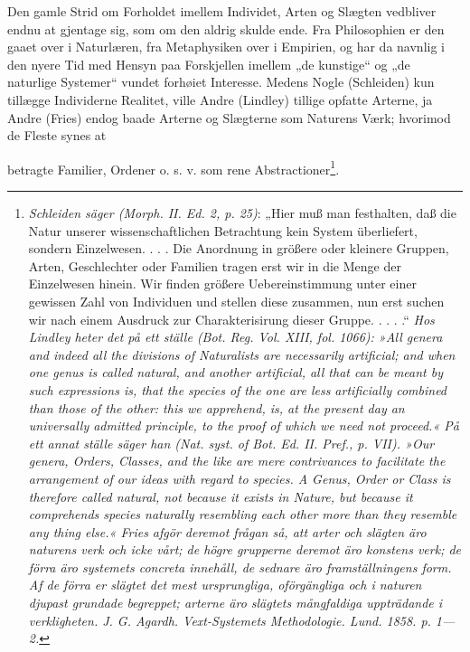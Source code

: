 \documentclass[12pt,a4paper]{book}
\begin{document}
Den gamle Strid om Forholdet imellem Individet, Arten og Slægten
vedbliver endnu at gjentage sig, som om den aldrig skulde ende. Fra
Philosophien er den gaaet over i Naturlæren, fra Metaphysiken over i
Empirien, og har da navnlig i den nyere Tid med Hensyn paa Forskjellen
imellem „de kunstige“ og „de naturlige Systemer“ vundet forhøiet
Interesse. Medens Nogle (Schleiden) kun tillægge Individerne Realitet,
ville Andre (Lindley) tillige opfatte Arterne, ja Andre (Fries) endog
baade Arterne og Slægterne som Naturens Værk; hvorimod de Fleste synes at

\setcounter{footnote}{0}
betragte Familier, Ordener o. s. v. som rene
Abstractioner\footnote{\textit{Schleiden säger (Morph. II. Ed. 2,
p. 25)}: „Hier muß man festhalten, daß die Natur unserer
wissenschaftlichen Betrachtung kein System überliefert, sondern
Einzelwesen. . . . Die Anordnung in größere oder kleinere Gruppen, Arten,
Geschlechter oder Familien tragen erst wir in die Menge der Einzelwesen
hinein. Wir finden größere Uebereinstimmung unter einer gewissen Zahl von
Individuen und stellen diese zusammen, nun erst suchen wir nach einem
Ausdruck zur Charakterisirung dieser Gruppe. . . . .“ \textit{Hos Lindley
heter det på ett ställe (Bot. Reg. Vol. XIII, fol. 1066): »All genera and
indeed all the divisions of Naturalists are necessarily artificial; and
when one genus is called natural, and another artificial, all that can be
meant by such expressions is, that the species of the one are less
artificially combined than those of the other: this we apprehend, is, at
the present day an universally admitted principle, to the proof of which
we need not proceed.« På ett annat ställe säger han (Nat. syst. of Bot.
Ed. II. Pref., p. VII). »Our genera, Orders, Classes, and the like are
mere contrivances to facilitate the arrangement of our ideas with regard
to species. A Genus, Order or Class is therefore called natural, not
because it exists in Nature, but because it comprehends species naturally
resembling each other more than they resemble any thing else.« Fries
afgör deremot frågan så, att arter och slägten äro naturens verk och icke
vårt; de högre grupperne deremot äro konstens verk; de förra äro
systemets concreta innehåll, de sednare äro framställningens form. Af de
förra er slägtet det mest ursprungliga, oförgängliga och i naturen
djupast grundade begreppet; arterne äro slägtets mångfaldiga uppträdande
i verkligheten. J. G. Agardh. Vext-Systemets Methodologie. Lund. 1858.
p. 1---2.}}.
\end{document}
